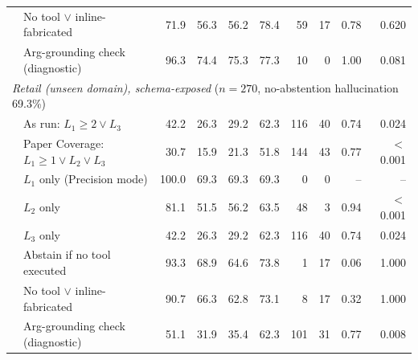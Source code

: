 \begin{table}[t]
{\begin{tabular}{llrrrrrrrr}
 & No tool $\lor$ inline-fabricated & 71.9 & 56.3 & 56.2 & 78.4 & 59 & 17 & 0.78 & 0.620 \\
 & Arg-grounding check (diagnostic) & 96.3 & 74.4 & 75.3 & 77.3 & 10 & 0 & 1.00 & 0.081 \\
\midrule
\multicolumn{10}{l}{\emph{Retail (unseen domain), schema-exposed} ($n{=}270$, no-abstention hallucination 69.3\%)} \\
 & As run: $L_1{\ge}2 \lor L_3$ & 42.2 & 26.3 & 29.2 & 62.3 & 116 & 40 & 0.74 & 0.024 \\
 & Paper Coverage: $L_1{\ge}1 \lor L_2 \lor L_3$ & 30.7 & 15.9 & 21.3 & 51.8 & 144 & 43 & 0.77 & $<$0.001 \\
 & $L_1$ only (Precision mode) & 100.0 & 69.3 & 69.3 & 69.3 & 0 & 0 & -- & -- \\
 & $L_2$ only & 81.1 & 51.5 & 56.2 & 63.5 & 48 & 3 & 0.94 & $<$0.001 \\
 & $L_3$ only & 42.2 & 26.3 & 29.2 & 62.3 & 116 & 40 & 0.74 & 0.024 \\
 & Abstain if no tool executed & 93.3 & 68.9 & 64.6 & 73.8 & 1 & 17 & 0.06 & 1.000 \\
 & No tool $\lor$ inline-fabricated & 90.7 & 66.3 & 62.8 & 73.1 & 8 & 17 & 0.32 & 1.000 \\
 & Arg-grounding check (diagnostic) & 51.1 & 31.9 & 35.4 & 62.3 & 101 & 31 & 0.77 & 0.008 \\
\bottomrule
\end{tabular}}
\end{table}
